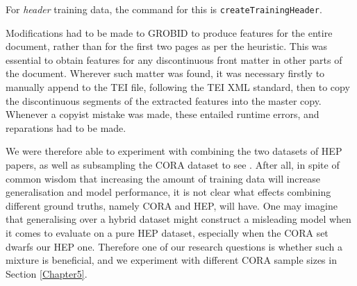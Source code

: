 For \emph{header} training data, the command for this is \texttt{createTrainingHeader}.

Modifications had to be made to GROBID to produce features for the entire document, rather than for the first two pages as per the heuristic. This was essential to obtain features for any discontinuous front matter in other parts of the document. Wherever such matter was found, it was necessary firstly to manually append to the TEI file, following the TEI XML standard, then to copy the discontinuous segments of the extracted features into the master copy. Whenever a copyist mistake was made, these entailed runtime errors, and reparations had to be made.

We were therefore able to experiment with combining the two datasets of HEP papers, as well as subsampling the CORA dataset to see . After all, in spite of common wisdom that increasing the amount of training data will increase generalisation and model performance, it is not clear what effects combining different ground truths, namely CORA and HEP, will have. One may imagine that generalising over a hybrid dataset might construct a misleading model when it comes to evaluate on a pure HEP dataset, especially when the CORA set dwarfs our HEP one. Therefore one of our research questions is whether such a mixture is beneficial, and we experiment with different CORA sample sizes in Section \ref{Chapter5}.

